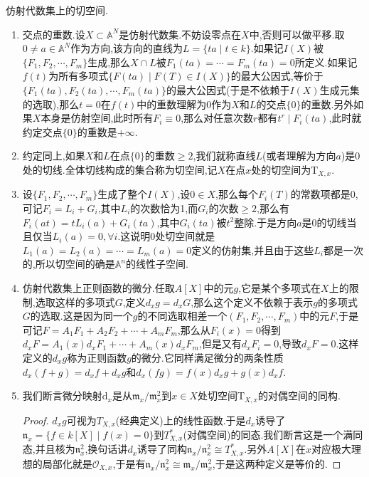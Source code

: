仿射代数集上的切空间.
\begin{enumerate}
	\item 交点的重数.设$X\subset\mathbb{A}^N$是仿射代数集.不妨设零点在$X$中,否则可以做平移.取$0\not=a\in\mathbb{A}^N$作为方向,该方向的直线为$L=\{ta\mid t\in k\}$.如果记$I(X)$被$\{F_1,F_2,\cdots,F_m\}$生成,那么$X\cap L$被$F_1(ta)=\cdots=F_m(ta)=0$所定义.如果记$f(t)$为所有多项式$\{F(ta)\mid F(T)\in I(X)\}$的最大公因式,等价于$\{F_1(ta),F_2(ta),\cdots,F_m(ta)\}$的最大公因式(于是不依赖于$I(X)$生成元集的选取),那么$t=0$在$f(t)$中的重数理解为$0$作为$X$和$L$的交点$\{0\}$的重数.另外如果$X$本身是仿射空间,此时所有$F_i\equiv0$,那么对任意次数$r$都有$t^r\mid F_i(ta)$,此时就约定交点$\{0\}$的重数是$+\infty$.
	\item 约定同上,如果$X$和$L$在点$\{0\}$的重数$\ge2$,我们就称直线$L$(或者理解为方向$a$)是0处的切线.全体切线构成的集合称为切空间,记$X$在点$x$处的切空间为$\mathrm{T}_{X,x}$.
	\item 设$\{F_1,F_2,\cdots,F_m\}$生成了整个$I(X)$,设$0\in X$,那么每个$F_i(T)$的常数项都是0,可记$F_i=L_i+G_i$,其中$L_i$的次数恰为1,而$G_i$的次数$\ge2$,那么有$F_i(at)=tL_i(a)+G_i(ta)$,其中$G_i(ta)$被$t^2$整除.于是方向$a$是0的切线当且仅当$L_i(a)=0,\forall i$.这说明0处切空间就是$L_1(a)=L_2(a)=\cdots=L_m(a)=0$定义的仿射集,并且由于这些$L_i$都是一次的,所以切空间的确是$\mathbb{A}^n$的线性子空间.
	\item 仿射代数集上正则函数的微分.任取$A[X]$中的元$g$,它是某个多项式在$X$上的限制,选取这样的多项式$G$,定义$d_xg=d_xG$,那么这个定义不依赖于表示$g$的多项式$G$的选取.这是因为同一个$g$的不同选取相差一个$(F_1,F_2,\cdots,F_m)$中的元$F$,于是可记$F=A_1F_1+A_2F_2+\cdots+A_mF_m$,那么从$F_i(x)=0$得到$d_xF=A_1(x)d_xF_1+\cdots+A_m(x)d_xF_m$,但是又有$d_xF_i=0$,导致$d_xF=0$.这样定义的$d_xg$称为正则函数$g$的微分.它同样满足微分的两条性质$d_x(f+g)=d_xf+d_xg$和$d_x(fg)=f(x)d_xg+g(x)d_xf$.
	\item 我们断言微分映射$\mathrm{d}_x$是从$\mathfrak{m}_x/\mathfrak{m}_x^2$到$x\in X$处切空间$\mathrm{T}_{X,x}$的对偶空间的同构.
	\begin{proof}
		
		$d_xg$可视为$T_{X,x}$(经典定义)上的线性函数.于是$d_x$诱导了$\mathfrak{n}_x=\{f\in k[X]\mid f(x)=0\}$到$T_{X,x}^*$(对偶空间)的同态.我们断言这是一个满同态,并且核为$\mathfrak{n}_x^2$,换句话讲$d_x$诱导了同构$\mathfrak{n}_x/\mathfrak{n}_x^2\cong T_{X,x}^*$.另外$A[X]$在$x$对应极大理想的局部化就是$\mathscr{O}_{X,x}$,于是有$\mathfrak{n}_x/\mathfrak{n}_x^2\cong\mathfrak{m}_x/\mathfrak{m}_x^2$,于是这两种定义是等价的.
		
		\qquad
		

\end{proof}
\end{enumerate}

